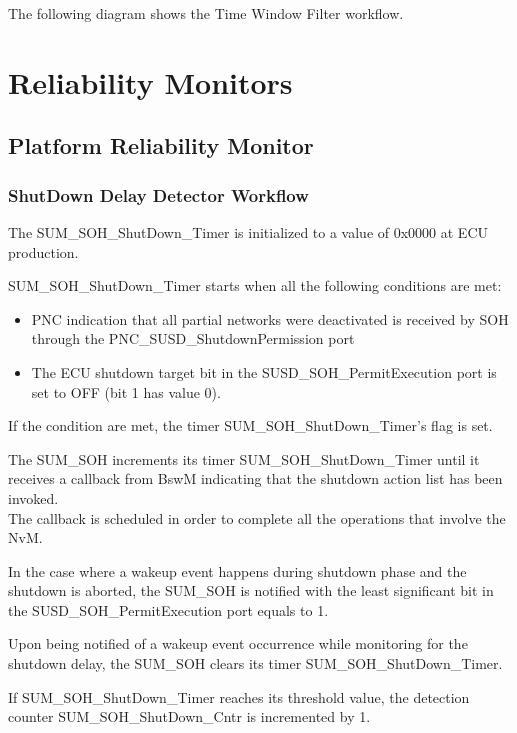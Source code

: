 The following diagram shows the Time Window Filter workflow.


\section{Reliability Monitors}
\subsection{Platform Reliability Monitor}
\subsubsection{ShutDown Delay Detector Workflow}
{
	The SUM_SOH_ShutDown_Timer is initialized to a value of 0x0000 at ECU production.
}
{		}

{
	SUM_SOH_ShutDown_Timer starts when all the following conditions are met:
	\begin{itemize}
		\item PNC indication that all partial networks were deactivated is received by SOH through the PNC_SUSD_ShutdownPermission port
		\item The ECU shutdown target bit in the SUSD_SOH_PermitExecution port is set to OFF (bit 1 has value 0).
	\end{itemize}
	If the condition are met, the timer SUM_SOH_ShutDown_Timer's flag is set.
}
{	  }

{
	The SUM_SOH increments its timer SUM_SOH_ShutDown_Timer until it receives a callback from BswM indicating that the shutdown action list has been invoked.\\
	The callback is scheduled in order to complete all the operations that involve the NvM.
}
{		}

{
	In the case where a wakeup event happens during shutdown phase and the shutdown is aborted, the SUM_SOH is notified with
	the least significant bit in the SUSD_SOH_PermitExecution port equals to 1.
}
{		}

{
	Upon being notified of a wakeup event occurrence while monitoring for the shutdown delay, the SUM_SOH clears its timer SUM_SOH_ShutDown_Timer.
}
{		}


{
	If SUM_SOH_ShutDown_Timer reaches its threshold value, the detection counter SUM_SOH_ShutDown_Cntr is incremented by 1.
}
{		}

